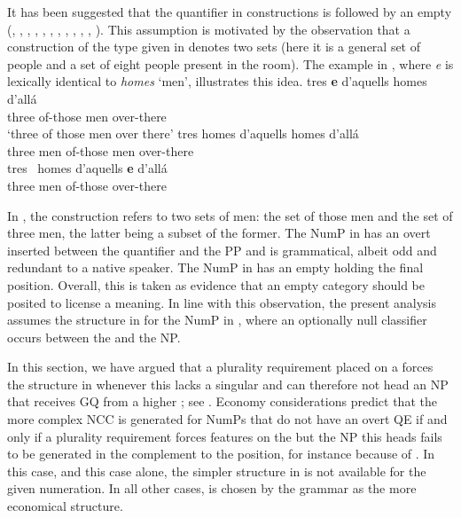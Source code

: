 \documentclass[output=paper,modfonts,newtxmath,hidelinks]{langscibook}
\begin{document}
It has been suggested that the quantifier in  constructions is followed by an empty  (\citealt{Milner1978}, \citealt{Bonet1986}, \citealt{Abney1987}, \citealt{Hernanz-Brucart1987}, \citealt{Delsing1988, Delsing1993}, \citealt{Ramos1992}, \citealt{Cardinaletti-Giusti1992, Cardinaletti-Giusti2006}, \citealt{Sleeman1996}, \citealt{Doetjes1997}, \citealt{Barker1998}, \citealt{Brucart-Rigau2002}, \citealt{Ionin-etal2006}). This assumption is motivated by the observation that a  construction of the type given in  denotes two sets (here it is a general set of people and a set of eight people present in the room). The  example in , where \textit{e} is lexically identical to \textit{homes} ‘men’, illustrates this idea. 
\ea {} \citep[27]{MartiiGirbau2010} \label{18:ex26}
	\ea \label{18:ex26a}
		\gll tres  \textbf{e}  d’aquells  homes     d’allá\\
			 three {} of-those men over-there\\
		\glt `three of those men over there'
	\ex \label{18:ex26b}
		\gll tres homes d’aquells homes d’allá\\
			 three men of-those men over-there\\
    \ex \label{18:ex26c}
		\gll tres~   homes   d’aquells   \textbf{e}   d’allá~ ~\\
			 three men of-those { } over-there\\
	\z
\z

\noindent In , the  construction refers to two sets of men: the set of those men and the set of three men, the latter being a subset of the former. The NumP in  has an overt  inserted between the quantifier and the PP and is grammatical, albeit odd and redundant to a native speaker. The NumP in  has an empty  holding the final  position. Overall, this is taken as evidence that an empty  category should be posited to license a  meaning. In line with this observation, the present analysis assumes the structure in  for the  NumP in , where an optionally null classifier occurs between the  and the  NP. 

In this section, we have argued that a plurality requirement placed on a  forces the structure in  whenever this  lacks a singular  and can therefore not head an NP that receives GQ from a higher ; see . Economy considerations predict that the more complex NCC is generated for NumPs that do not have an overt QE if and only if a plurality requirement forces  features on the  but the NP this  heads fails to be generated in the complement to the  position, for instance because of . In this case, and this case alone, the simpler structure in  is not available for the given numeration. In all other cases,  is chosen by the grammar as the more economical structure.
\end{document}
